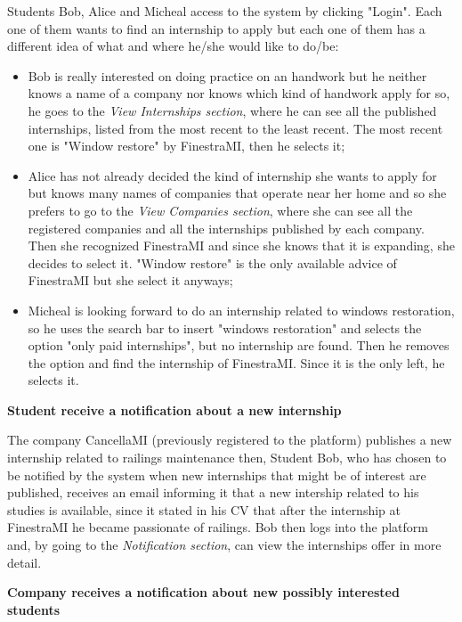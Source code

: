 			\begin{flushleft}
				Students Bob, Alice and Micheal access to the system by clicking "Login". Each one of them wants to find an internship to apply but each one of them has a different idea of what and where he/she would like to do/be:
				\begin{itemize}
					\item Bob is really interested on doing practice on an handwork but he neither knows a name of a company nor knows which kind of handwork apply for so, he goes to the \emph{View Internships section}, where he can see all the published internships, listed from the most recent to the least recent. The most recent one is "Window restore" by FinestraMI, then he selects it;
					\item Alice has not already decided the kind of internship she wants to apply for but knows many names of companies that operate near her home and so she prefers to go to the \emph{View Companies section}, where she can see all the registered companies and all the internships published by each company. Then she recognized FinestraMI and since she knows that it is expanding, she decides to select it. "Window restore" is the only available advice of FinestraMI but she select it anyways;
					\item Micheal is looking forward to do an internship related to windows restoration, so he uses the search bar to insert "windows restoration" and selects the option "only paid internships", but no internship are found. Then he removes the option and find the internship of FinestraMI. Since it is the only left, he selects it.
				\end{itemize} 
			\end{flushleft}
			\textbf{Student receive a notification about a new internship}
			\begin{flushleft}
				The company CancellaMI (previously registered to the platform) publishes a new internship related to railings maintenance then, Student Bob, who has chosen to be notified by the system when new internships that might be of interest are published, receives an email informing it that a new intership related to his studies is available, since it stated in his CV that after the internship at FinestraMI he became passionate of railings. Bob then logs into the platform and, by going to the \emph{Notification section}, can view the internships offer in more detail.
			\end{flushleft}
			\textbf{Company receives a notification about new possibly interested students}
